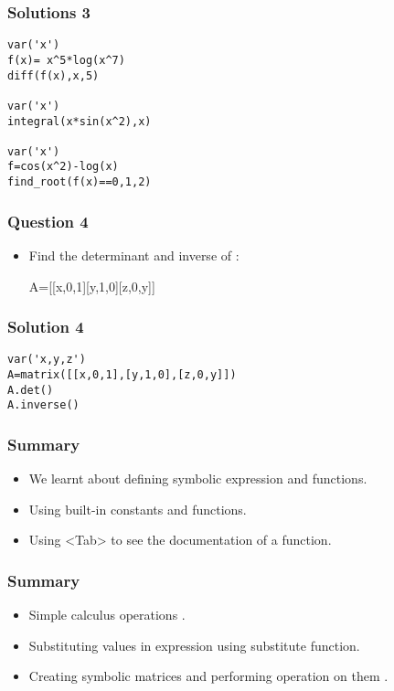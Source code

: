 \documentclass[presentation]{beamer}
\begin{document}
\begin{frame}[fragile]
\frametitle{Solutions 3}
\label{sec-10}

\begin{verbatim}
var('x')
f(x)= x^5*log(x^7) 
diff(f(x),x,5)

var('x')
integral(x*sin(x^2),x) 

var('x')
f=cos(x^2)-log(x)
find_root(f(x)==0,1,2)
\end{verbatim}
\end{frame}
\begin{frame}
\frametitle{Question 4}
\label{sec-11}

\begin{itemize}
\item Find the determinant and inverse of :

      A=[[x,0,1][y,1,0][z,0,y]]
\end{itemize}
\end{frame}
\begin{frame}[fragile]
\frametitle{Solution 4}
\label{sec-12}

\begin{verbatim}
var('x,y,z')
A=matrix([[x,0,1],[y,1,0],[z,0,y]])
A.det()
A.inverse()
\end{verbatim}
\end{frame}
\begin{frame}
\frametitle{Summary}
\label{sec-13}

\begin{itemize}
\item We learnt about defining symbolic 
   expression and functions.
\item Using built-in constants and functions.
\item Using <Tab>  to see the documentation of a 
   function.
\end{itemize}

 
\end{frame}
\begin{frame}
\frametitle{Summary}
\label{sec-14}

\begin{itemize}
\item Simple calculus operations .
\item Substituting values in expression 
   using substitute function.
\item Creating symbolic matrices and 
   performing operation on them .
\end{itemize}
\end{frame}
\end{document}

